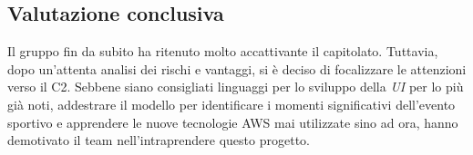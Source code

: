 \subsection{Valutazione conclusiva}
Il gruppo fin da subito ha ritenuto molto accattivante il capitolato\glo. Tuttavia, dopo un'attenta analisi dei rischi e vantaggi, si è deciso di focalizzare le attenzioni verso il C2. Sebbene siano consigliati linguaggi per lo sviluppo della \textit{UI\glo} per lo più già noti, addestrare il modello per identificare i momenti significativi dell'evento sportivo e apprendere le nuove tecnologie AWS mai utilizzate sino ad ora, hanno demotivato il team nell'intraprendere questo progetto.